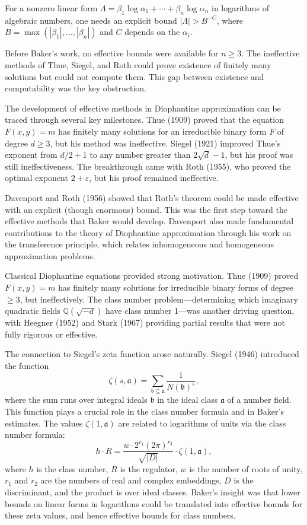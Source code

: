 For a nonzero linear form $\Lambda = \beta_1 \log \alpha_1 + \cdots + \beta_n \log \alpha_n$ in logarithms of algebraic numbers, one needs an explicit bound $|\Lambda| > B^{-C}$, where $B = \max(|\beta_1|, \ldots, |\beta_n|)$ and $C$ depends on the $\alpha_i$.

Before Baker's work, no effective bounds were available for $n \geq 3$. The ineffective methods of Thue, Siegel, and Roth could prove existence of finitely many solutions but could not compute them. This gap between existence and computability was the key obstruction.

The development of effective methods in Diophantine approximation can be traced through several key milestones. Thue (1909) proved that the equation $F(x,y) = m$ has finitely many solutions for an irreducible binary form $F$ of degree $d \geq 3$, but his method was ineffective. Siegel (1921) improved Thue's exponent from $d/2 + 1$ to any number greater than $2\sqrt{d} - 1$, but his proof was still ineffectiveness. The breakthrough came with Roth (1955), who proved the optimal exponent $2 + \varepsilon$, but his proof remained ineffective.

Davenport and Roth (1956) showed that Roth's theorem could be made effective with an explicit (though enormous) bound. This was the first step toward the effective methods that Baker would develop. Davenport also made fundamental contributions to the theory of Diophantine approximation through his work on the transference principle, which relates inhomogeneous and homogeneous approximation problems.

Classical Diophantine equations provided strong motivation. Thue (1909) proved $F(x,y) = m$ has finitely many solutions for irreducible binary forms of degree $\geq 3$, but ineffectively. The class number problem---determining which imaginary quadratic fields $\mathbb{Q}(\sqrt{-d})$ have class number 1---was another driving question, with Heegner (1952) and Stark (1967) providing partial results that were not fully rigorous or effective.

The connection to Siegel's zeta function arose naturally. Siegel (1946) introduced the function
\[
\zeta(s, \mathfrak{a}) = \sum_{\mathfrak{b} \subseteq \mathfrak{a}} \frac{1}{N(\mathfrak{b})^s},
\]
where the sum runs over integral ideals $\mathfrak{b}$ in the ideal class $\mathfrak{a}$ of a number field. This function plays a crucial role in the class number formula and in Baker's estimates. The values $\zeta(1, \mathfrak{a})$ are related to logarithms of units via the class number formula:
\[
h \cdot R = \frac{w \cdot 2^{r_1} (2\pi)^{r_2}}{\sqrt{|D|}} \cdot \zeta(1, \mathfrak{a}),
\]
where $h$ is the class number, $R$ is the regulator, $w$ is the number of roots of unity, $r_1$ and $r_2$ are the numbers of real and complex embeddings, $D$ is the discriminant, and the product is over ideal classes. Baker's insight was that lower bounds on linear forms in logarithms could be translated into effective bounds for these zeta values, and hence effective bounds for class numbers.

